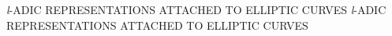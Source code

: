 %
  {\textit{l}-ADIC REPRESENTATIONS ATTACHED TO ELLIPTIC CURVES}%
  {\textit{l}-ADIC REPRESENTATIONS ATTACHED TO ELLIPTIC CURVES}





